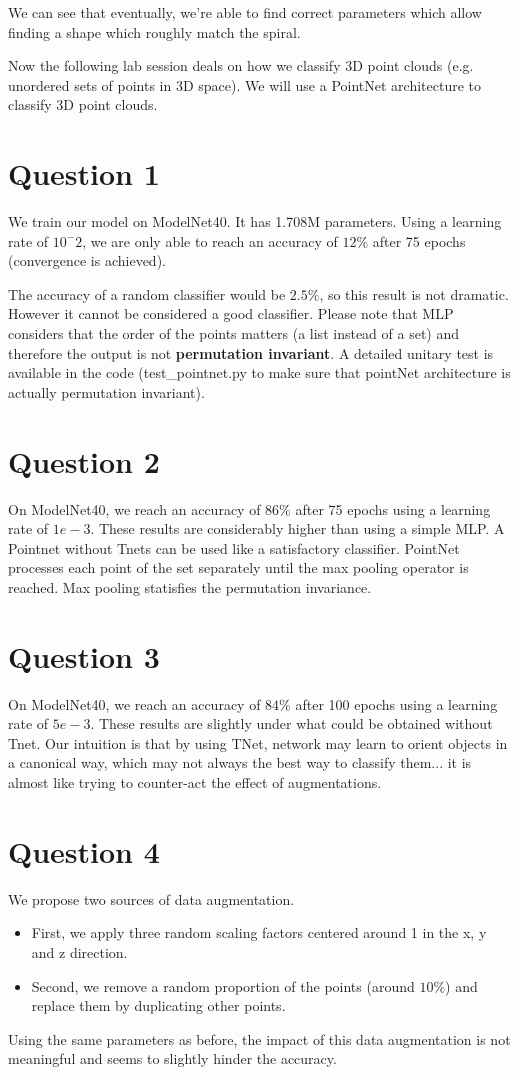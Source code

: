 \documentclass[a4paper]{article}
\begin{document}
We can see that eventually, we're able to find correct parameters which allow finding a shape which roughly match the spiral.   

Now the following lab session deals on how we classify 3D point clouds (e.g. unordered sets of points in 3D space). We will use a PointNet architecture to classify 3D point clouds.

\section*{Question 1}

We train our model on ModelNet40. It has 1.708M parameters. Using a learning rate of $10^{-}2$, we
are only able to reach an accuracy of $12\%$ after 75 epochs (convergence is achieved).

The accuracy of a random classifier would be $2.5\%$, so this result is not dramatic. 
However it cannot be considered a good classifier.
Please note that MLP considers that the order of the points matters (a list instead of a set) and therefore the output is not \textbf{permutation invariant}.
A detailed unitary test is available in the code (test\_pointnet.py to make sure that pointNet architecture is actually permutation invariant).


\section*{Question 2}
On ModelNet40, we reach an accuracy of $86\%$ after 75 epochs using a learning rate of $1e-3$.
These results are considerably higher than using a simple MLP. A Pointnet without Tnets can be used
like a satisfactory classifier.
PointNet processes each point of the set separately until the max pooling operator is reached. Max pooling statisfies the permutation invariance.


\section*{Question 3}
On ModelNet40, we reach an accuracy of $84\%$ after 100 epochs using a learning rate of $5e-3$.
These results are slightly under what could be obtained without Tnet.
Our intuition is that by using TNet, network may learn to orient objects in a canonical way, which may not always the best way to classify them... it is almost like trying to counter-act the effect of augmentations.

\section*{Question 4}
We propose two sources of data augmentation. 
\begin{itemize}
    \item First, we apply three random scaling factors centered around 1 in the x, y and z direction. 
    \item Second, we remove a random proportion of the points (around $10\%$) and replace them by duplicating other points.
\end{itemize}
Using the same parameters as before, the impact of this data augmentation is not meaningful and seems to slightly hinder the accuracy.
\end{document}

